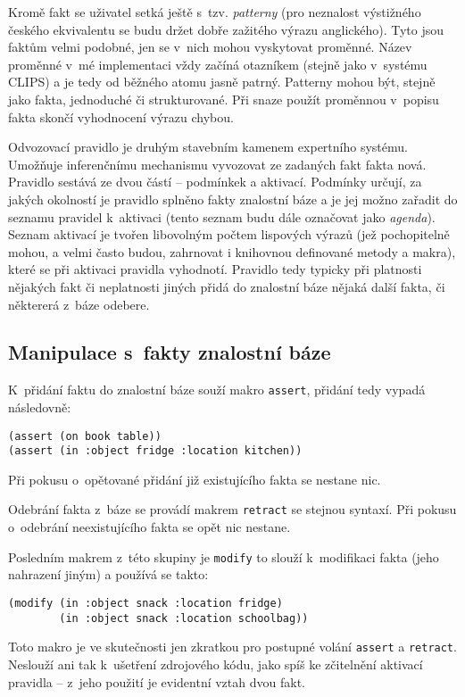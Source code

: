 Kromě fakt se uživatel setká ještě s~tzv. \emph{patterny} (pro neznalost
výstižného českého ekvivalentu se budu držet dobře zažitého výrazu anglického).
Tyto jsou faktům velmi podobné, jen se v~nich mohou vyskytovat proměnné.
Název proměnné v~mé implementaci vždy začíná otazníkem (stejně jako v~systému
CLIPS) a je tedy od běžného atomu jasně patrný. Patterny mohou být, stejně
jako fakta, jednoduché či strukturované. Při snaze použít proměnnou v~popisu
fakta skončí vyhodnocení výrazu chybou.

Odvozovací pravidlo je druhým stavebním kamenem expertního systému. Umožňuje
inferenčnímu mechanismu vyvozovat ze zadaných fakt fakta nová. Pravidlo sestává
ze dvou částí -- podmínkek a aktivací. Podmínky určují, za jakých okolností je 
pravidlo splněno fakty znalostní báze a je jej možno zařadit do seznamu pravidel
k~aktivaci (tento seznam budu dále označovat jako \emph{agenda}). Seznam
aktivací je tvořen libovolným počtem lispových výrazů (jež pochopitelně mohou,
a velmi často budou, zahrnovat i knihovnou definované metody a makra), které se
při aktivaci pravidla vyhodnotí. Pravidlo tedy typicky při platnosti nějakých
fakt či neplatnosti jiných přidá do znalostní báze nějaká další fakta, či
některerá z~báze odebere.
\subsection{Manipulace s~fakty znalostní báze}
K~přidání faktu do znalostní báze souží makro \verb|assert|, přidání tedy
vypadá následovně:
\begin{verbatim}
(assert (on book table))
(assert (in :object fridge :location kitchen))
\end{verbatim}
Při pokusu o~opětované přidání již existujícího fakta se nestane nic.

Odebrání fakta z~báze se provádí makrem \verb|retract| se stejnou syntaxí.
Při pokusu o~odebrání neexistujícího fakta se opět nic nestane.

Posledním makrem z~této skupiny je \verb|modify| to slouží k~modifikaci
fakta (jeho nahrazení jiným) a používá se takto:
\begin{verbatim}
(modify (in :object snack :location fridge)
        (in :object snack :location schoolbag))
\end{verbatim}
Toto makro je ve skutečnosti jen zkratkou pro postupné volání \verb|assert|
a \verb|retract|. Neslouží ani tak k~ušetření zdrojového kódu, jako spíš
ke zčitelnění aktivací pravidla -- z~jeho použití je evidentní vztah dvou
fakt.

